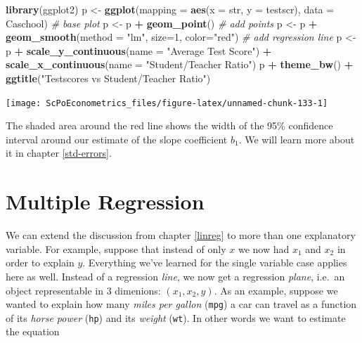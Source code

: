 \documentclass[]{book}
\newenvironment{Shaded}{\begin{snugshade}}{\end{snugshade}}
\newcommand{\KeywordTok}[1]{\textcolor[rgb]{0.13,0.29,0.53}{\textbf{#1}}}
\newcommand{\DataTypeTok}[1]{\textcolor[rgb]{0.13,0.29,0.53}{#1}}
\newcommand{\DecValTok}[1]{\textcolor[rgb]{0.00,0.00,0.81}{#1}}
\newcommand{\StringTok}[1]{\textcolor[rgb]{0.31,0.60,0.02}{#1}}
\newcommand{\CommentTok}[1]{\textcolor[rgb]{0.56,0.35,0.01}{\textit{#1}}}
\newcommand{\OperatorTok}[1]{\textcolor[rgb]{0.81,0.36,0.00}{\textbf{#1}}}
\newcommand{\NormalTok}[1]{#1}
\theoremstyle{definition}
\theoremstyle{definition}
\theoremstyle{definition}
\theoremstyle{remark}
\begin{document}
\begin{Shaded}
\begin{Highlighting}[]
\KeywordTok{library}\NormalTok{(ggplot2)}
\NormalTok{p <-}\StringTok{ }\KeywordTok{ggplot}\NormalTok{(}\DataTypeTok{mapping =} \KeywordTok{aes}\NormalTok{(}\DataTypeTok{x =}\NormalTok{ str, }\DataTypeTok{y =}\NormalTok{ testscr), }\DataTypeTok{data =}\NormalTok{ Caschool) }\CommentTok{# base plot}
\NormalTok{p <-}\StringTok{ }\NormalTok{p }\OperatorTok{+}\StringTok{ }\KeywordTok{geom_point}\NormalTok{() }\CommentTok{# add points}
\NormalTok{p <-}\StringTok{ }\NormalTok{p }\OperatorTok{+}\StringTok{ }\KeywordTok{geom_smooth}\NormalTok{(}\DataTypeTok{method =} \StringTok{"lm"}\NormalTok{, }\DataTypeTok{size=}\DecValTok{1}\NormalTok{, }\DataTypeTok{color=}\StringTok{"red"}\NormalTok{) }\CommentTok{# add regression line}
\NormalTok{p <-}\StringTok{ }\NormalTok{p }\OperatorTok{+}\StringTok{ }\KeywordTok{scale_y_continuous}\NormalTok{(}\DataTypeTok{name =} \StringTok{"Average Test Score"}\NormalTok{) }\OperatorTok{+}\StringTok{ }
\StringTok{         }\KeywordTok{scale_x_continuous}\NormalTok{(}\DataTypeTok{name =} \StringTok{"Student/Teacher Ratio"}\NormalTok{)}
\NormalTok{p }\OperatorTok{+}\StringTok{ }\KeywordTok{theme_bw}\NormalTok{() }\OperatorTok{+}\StringTok{ }\KeywordTok{ggtitle}\NormalTok{(}\StringTok{"Testscores vs Student/Teacher Ratio"}\NormalTok{)}
\end{Highlighting}
\end{Shaded}

\begin{center}\texttt{[image: ScPoEconometrics\_files/figure-latex/unnamed-chunk-133-1]} \end{center}

The shaded area around the red line shows the width of the 95\%
confidence interval around our estimate of the slope coefficient
\(b_1\). We will learn more about it in chapter \ref{std-errors}.

\chapter{Multiple Regression}\label{multiple-reg}

We can extend the discussion from chapter \ref{linreg} to more than one
explanatory variable. For example, suppose that instead of only \(x\) we
now had \(x_1\) and \(x_2\) in order to explain \(y\). Everything we've
learned for the single variable case applies here as well. Instead of a
regression \emph{line}, we now get a regression \emph{plane}, i.e.~an
object representable in 3 dimenions: \((x_1,x_2,y)\). As an example,
suppose we wanted to explain how many \emph{miles per gallon}
(\texttt{mpg}) a car can travel as a function of its \emph{horse power}
(\texttt{hp}) and its \emph{weight} (\texttt{wt}). In other words we
want to estimate the equation
\end{document}
